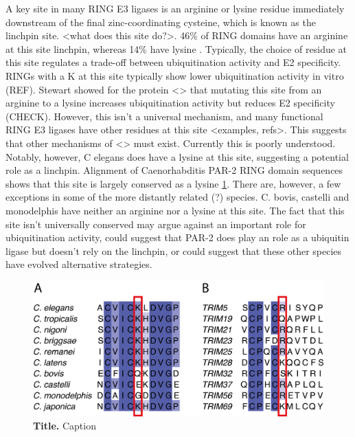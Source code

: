 \documentclass[12pt]{"article"}
\newcommand{\mycaption}[2]{\caption[#1]{\textbf{#1.} #2}}
\begin{document}
A key site in many RING E3 ligases is an arginine or lysine residue immediately downstream of the final zinc-coordinating cysteine, which is known as the linchpin site. <what does this site do?>. 46\% of RING domains have an arginine at this site linchpin, whereas 14\% have lysine \citep{Stewart2017}. Typically, the choice of residue at this site regulates a trade-off between ubiquitination activity and E2 specificity. RINGs with a K at this site typically show lower ubiquitination activity in vitro (REF). Stewart showed for the protein <> that mutating this site from an arginine to a lysine increases ubiquitination activity but reduces E2 specificity (CHECK). However, this isn’t a universal mechanism, and many functional RING E3 ligases have other residues at this site <examples, refs>. This suggests that other mechanisms of <> must exist. Currently this is poorly understood.\\

Notably, however, C elegans does have a lysine at this site, suggesting a potential role as a linchpin. Alignment of Caenorhabditis PAR-2 RING domain sequences shows that this site is largely conserved as a lysine \cref{fig:linchpin_alignments}. There are, however, a few exceptions in some of the more distantly related (?) species. C. bovis, castelli and monodelphis have neither an arginine nor a lysine at this site. The fact that this site isn’t universally conserved may argue against an important role for ubiquitination activity, could suggest that PAR-2 does play an role as a ubiquitin ligase but doesn’t rely on the linchpin, or could suggest that these other species have evolved alternative strategies.\\ 

\begin{figure}[!h]
\includegraphics[scale=0.9]{linchpin_alignments}
\setlength{\abovecaptionskip}{20pt}
\centering
\mycaption{Title}{Caption}
\label{fig:linchpin_alignments}
\end{figure}
\end{document}
